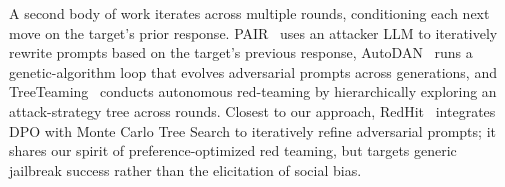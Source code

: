 \documentclass[lettersize,journal]{IEEEtran}
\begin{document}
A second body of work iterates across multiple rounds, conditioning each next move on the target's prior response.
PAIR~\cite{chao2025jailbreaking} uses an attacker LLM to iteratively rewrite prompts based on the target's previous response, AutoDAN~\cite{liu2023autodan} runs a genetic-algorithm loop that evolves adversarial prompts across generations, and TreeTeaming~\cite{treeteaming2026} conducts autonomous red-teaming by hierarchically exploring an attack-strategy tree across rounds.
Closest to our approach, RedHit~\cite{sorkhpour2025redhit} integrates DPO with Monte Carlo Tree Search to iteratively refine adversarial prompts; it shares our spirit of preference-optimized red teaming, but targets generic jailbreak success rather than the elicitation of social bias.
%
%
%
%
\end{document}
